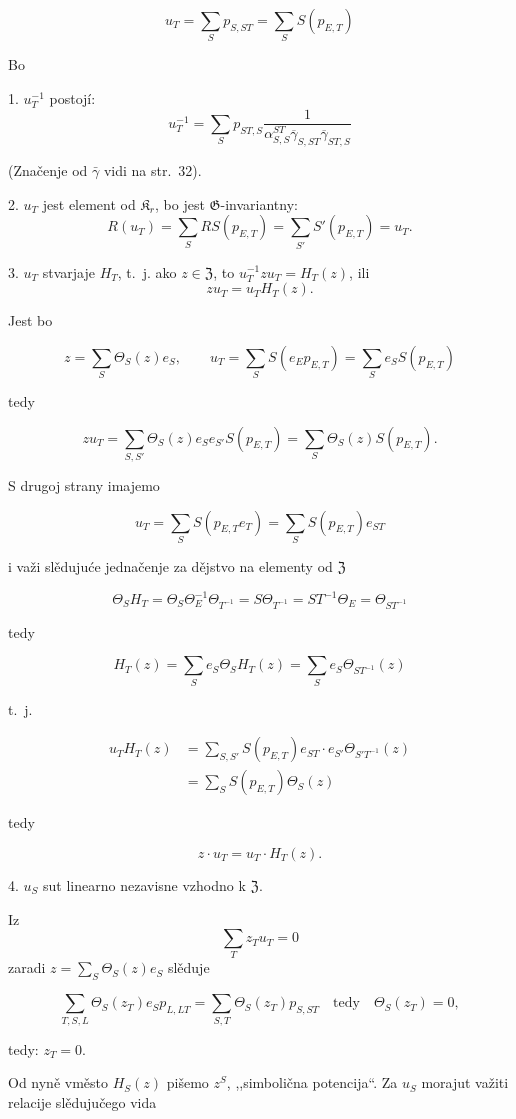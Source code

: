 \documentclass[11pt]{article}
\begin{document}
\[
u_T=\sum_S p_{S,ST}=\sum_S S(p_{E,T})
\]

Bo

1. \(u_T^{-1}\) postojí:
\[
u_T^{-1}=\sum_S p_{ST,S}
\frac{1}{\alpha_{S,S}^{ST}\overline{\gamma}_{S,ST}\overline{\gamma}_{ST,S}}
\]

(Značenje od \(\bar{\gamma}\) vidi na str.~32).

2. \(u_T\) jest element od \(\mathfrak K_r\), bo jest \(\mathfrak G\)-invariantny:
\[
R(u_T)=\sum_S RS(p_{E,T})=\sum_{S'} S'(p_{E,T})=u_T.
\]

3. \(u_T\) stvarjaje \(H_T\), t.~j. ako \(z\in\mathfrak Z\), to \(u_T^{-1}zu_T=H_T(z)\), ili
\[
z u_T=u_T H_T(z).
\]

Jest bo

\[
z=\sum_S\Theta_S(z)e_S,\qquad
u_T=\sum_S S(e_Ep_{E,T})=\sum_S e_S S(p_{E,T})
\]

tedy

\[
zu_T=\sum_{S,S'}\Theta_S(z)e_Se_{S'}S(p_{E,T})
=\sum_S\Theta_S(z)S(p_{E,T}).
\]

S drugoj strany imajemo

\[
u_T=\sum_S S(p_{E,T}e_T)=\sum_S S(p_{E,T})e_{ST}
\]

i važi slědujuće jednačenje za dějstvo na elementy od \(\mathfrak Z\)

\[
\Theta_S H_T=\Theta_S\Theta_E^{-1}\Theta_{T^{-1}}
=S\Theta_{T^{-1}}=ST^{-1}\Theta_E=\Theta_{ST^{-1}}
\]

tedy

\[
H_T(z)=\sum_S e_S\Theta_S H_T(z)=\sum_S e_S\Theta_{ST^{-1}}(z)
\]

t.~j.

\[
\begin{aligned}
u_TH_T(z)
&=\sum_{S,S'} S(p_{E,T})e_{ST}\cdot e_{S'}\Theta_{S'T^{-1}}(z)\\
&=\sum_S S(p_{E,T})\Theta_S(z)
\end{aligned}
\]

tedy

\[
z\cdot u_T=u_T\cdot H_T(z).
\]

4. \(u_S\) sut linearno nezavisne vzhodno k \(\mathfrak Z\).

Iz
\[
\sum_T z_Tu_T=0
\]
zaradi \(z=\sum_S\Theta_S(z)e_S\) slěduje

\[
\sum_{T,S,L}\Theta_S(z_T)e_Sp_{L,LT}
=\sum_{S,T}\Theta_S(z_T)p_{S,ST}\quad\text{tedy}\quad
\Theta_S(z_T)=0,
\]

tedy: \(z_T=0\).

Od nyně vměsto \(H_S(z)\) pišemo \(z^S\), ,,simbolična potencija``. Za \(u_S\) morajut važiti relacije slědujučego vida
\end{document}
